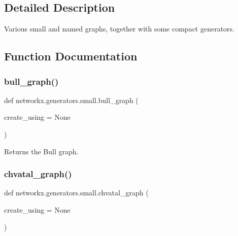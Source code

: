 \subsection{Detailed Description}
\begin{DoxyVerb}Various small and named graphs, together with some compact generators.\end{DoxyVerb}
 

\subsection{Function Documentation}
\mbox{\label{namespacenetworkx_1_1generators_1_1small_aab1031eb04038acdaa287ba7dbf76d2d}} 
\subsubsection{\texorpdfstring{bull\+\_\+graph()}{bull\_graph()}}
{\footnotesize\ttfamily def networkx.\+generators.\+small.\+bull\+\_\+graph (\begin{DoxyParamCaption}\item[{}]{create\+\_\+using = {\ttfamily None} }\end{DoxyParamCaption})}

\begin{DoxyVerb}Returns the Bull graph.\end{DoxyVerb}
 \mbox{\label{namespacenetworkx_1_1generators_1_1small_aa6bf238ab5cb676560244e26d99a2752}} 
\subsubsection{\texorpdfstring{chvatal\+\_\+graph()}{chvatal\_graph()}}
{\footnotesize\ttfamily def networkx.\+generators.\+small.\+chvatal\+\_\+graph (\begin{DoxyParamCaption}\item[{}]{create\+\_\+using = {\ttfamily None} }\end{DoxyParamCaption})}

